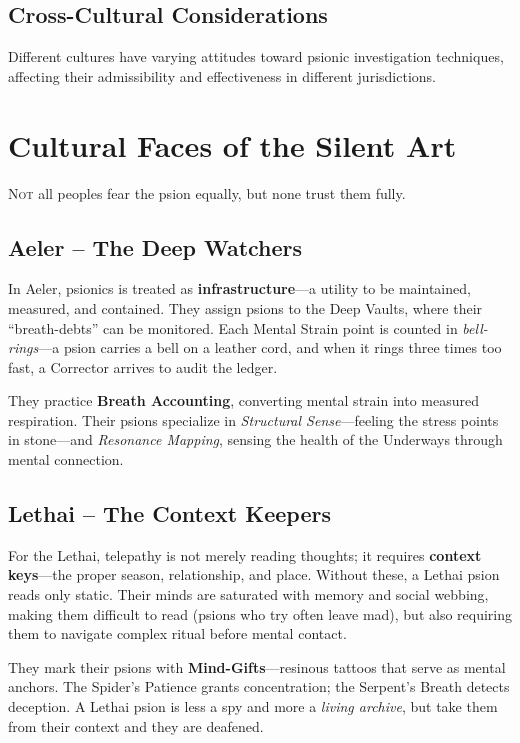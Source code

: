 \documentclass[11pt,twoside]{article}
\begin{document}
\subsection*{Cross-Cultural Considerations}
Different cultures have varying attitudes toward psionic investigation techniques, affecting their admissibility and effectiveness in different jurisdictions.

\section{Cultural Faces of the Silent Art}

\lettrine{N}{ot} all peoples fear the psion equally, but none trust them fully.

\subsection{Aeler -- The Deep Watchers}
In Aeler, psionics is treated as \textbf{infrastructure}---a utility to be maintained, measured, and contained. They assign psions to the Deep Vaults, where their ``breath-debts'' can be monitored. Each Mental Strain point is counted in \textit{bell-rings}---a psion carries a bell on a leather cord, and when it rings three times too fast, a Corrector arrives to audit the ledger.

They practice \textbf{Breath Accounting}, converting mental strain into measured respiration. Their psions specialize in \textit{Structural Sense}---feeling the stress points in stone---and \textit{Resonance Mapping}, sensing the health of the Underways through mental connection.

\subsection{Lethai -- The Context Keepers}
For the Lethai, telepathy is not merely reading thoughts; it requires \textbf{context keys}---the proper season, relationship, and place. Without these, a Lethai psion reads only static. Their minds are saturated with memory and social webbing, making them difficult to read (psions who try often leave mad), but also requiring them to navigate complex ritual before mental contact.

They mark their psions with \textbf{Mind-Gifts}---resinous tattoos that serve as mental anchors. The Spider's Patience grants concentration; the Serpent's Breath detects deception. A Lethai psion is less a spy and more a \textit{living archive}, but take them from their context and they are deafened.
\end{document}
